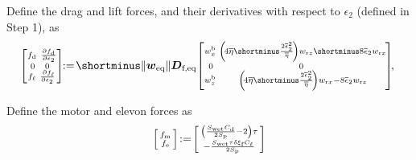 \begin{algorithm}
\begin{algorithmic}[1]
\State Define the drag and lift forces, and their derivatives with respect to $\epsilon_2$ (defined in Step 1), as
\begin{equation}
\label{eq:draglift_ALG}
\!\! \smallmat{\!f_{\text{d}} & \frac{\partial  f_{\text{d}}  }{\partial \epsilon_{2}} \!\! \\ 0 & 0  \\ \! f_{\ell} & \frac{\partial  f_{\ell} \!\! }{\partial \epsilon_{2}}} 
 \!\! := \! 
    \shortminus \| \boldsymbol{w}_{\mathrm{eq}} \|  \boldsymbol{D}_{\text{f,eq}}\! 
    \smallmat{\! w^{\text{b}}_{x} &  \left(\! 4 \overline{\eta}  \shortminus \frac{2\overline \epsilon_{2}^{2}}{\overline{\eta} } \! \right) w_{\text{r}z} \shortminus 8 \overline \epsilon_{2}  w_{\text{r}x} \!\! \\  0 & 0 \\  
   \! w^{\text{b}}_{z} &    \left(\! 4 \overline{\eta}  \shortminus \frac{2\overline \epsilon_{2}^{2}}{\overline{\eta} } \! \right) w_{\text{r}x} -8 \overline \epsilon_{2} w_{\text{r}z} \!\!
    }\!\!, 
\end{equation}

\State Define the motor and elevon forces as
\begin{align}
\label{eq:motor_elevon_forces}
    \left[ \begin{smallmatrix} f_{\text{m}}  \\f_{\text{e}}  \end{smallmatrix} \right]\! := \!\left[ \begin{smallmatrix}\left(\frac{S_{\text{wet}}C_{\text{d}}}{2S_{\text{p}}}-2\right)\tau \\  - \frac{S_{\text{wet}}\tau \delta \xi_{\text{f}} C_{\ell}}{2S_{\text{p}}} \end{smallmatrix} \right]
\end{align}


\end{algorithmic}
\end{algorithm}
